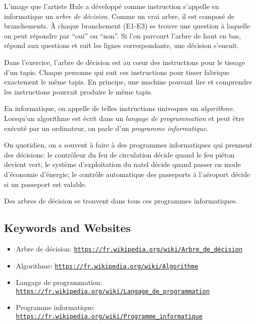 \documentclass[a4paper,11pt]{report}
\newcommand{\BrochureUrlText}[1]{\texttt{#1}}
\newcommand{\taskGraphicsFolder}{..}
\begin{document}
L’image que l’artiste Hale a développé comme instruction s’appelle en informatique un \emph{arbre de décision}. Comme un vrai arbre, il est composé de branchements. À chaque branchement (E1-E3) se trouve une question à laquelle on peut répondre par “oui” ou “non”. Si l’on parcourt l’arbre de haut en bas, répond aux questions et suit les lignes correspondante, une décision s’ensuit.

{\centering%
\par}




Dans l’exercice, l’arbre de décision est au cœur des instructions pour le tissage d’un tapis. Chaque personne qui suit ces instructions pour tisser fabrique exactement le même tapis. En principe, une machine pouvant lire et comprendre les instructions pourrait produire le même tapis.

En informatique, on appelle de telles instructions univoques un \emph{algorithme}. Lorsqu’un algorithme est écrit dans un \emph{langage de programmation} et peut être exécuté par un ordinateur, on parle d’un \emph{programme informatique}.

On quotidien, on a souvent à faire à des programmes informatiques qui prennent des décisions: le contrôleur du feu de circulation décide quand le feu piéton devient vert; le système d’exploitation du natel décide quand passer en mode d’économie d’énergie; le contrôle automatique des passeports à l’aéroport décide si un passeport est valable.

Des arbres de décision se trouvent dans tous ces programmes informatiques.

{\raggedright

\subsection*{Keywords and Websites}

\begin{itemize}
  \item Arbre de décision: \href{https://fr.wikipedia.org/wiki/Arbre_de_d\%C3\%A9cision}{\BrochureUrlText{https://fr.wikipedia.org/wiki/Arbre\_de\_décision}}
  \item Algorithme: \href{https://fr.wikipedia.org/wiki/Algorithme}{\BrochureUrlText{https://fr.wikipedia.org/wiki/Algorithme}}
  \item Langage de programmation: \href{https://fr.wikipedia.org/wiki/Langage_de_programmation}{\BrochureUrlText{https://fr.wikipedia.org/wiki/Langage\_de\_programmation}}
  \item Programme informatique: \href{https://fr.wikipedia.org/wiki/Programme_informatique}{\BrochureUrlText{https://fr.wikipedia.org/wiki/Programme\_informatique}}
\end{itemize}


}
\end{document}
